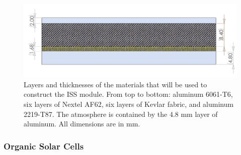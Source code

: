 \begin{figure}[h!]
	\begin{center}
		\includegraphics[width=\textwidth]{figures/iss-cross-section.png}
		\caption{Layers and thicknesses of the materials that will be used to construct the ISS module. From top to bottom: aluminum 6061-T6, six layers of Nextel AF62, six layers of Kevlar fabric, and aluminum 2219-T87. The atmosphere is contained by the 4.8 mm layer of aluminum. All dimensions are in mm.}
		\label{fig:iss-module}
	\end{center}
\end{figure}

\subsubsection{Organic Solar Cells}
